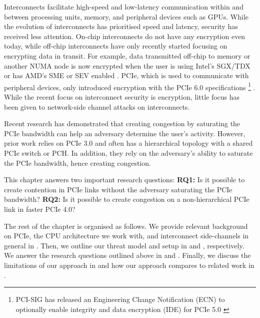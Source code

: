 
Interconnects facilitate high-speed and low-latency communication within and between processing units, memory, and peripheral devices such as GPUs.
While the evolution of interconnects has prioritised speed and latency, security has received less attention.
On-chip interconnects do not have any encryption even today, while off-chip interconnects have only recently started focusing on encrypting data in transit.
For example, data transmitted off-chip to memory or another NUMA node is now encrypted when the user is using Intel's SGX/TDX or has AMD's SME or SEV enabled \cite{intel_upi_encryption, amd_gen_5_arch}.
PCIe, which is used to communicate with peripheral devices, only introduced encryption with the PCIe 6.0 specifications 
\footnote{PCI-SIG has released an Engineering Change Notification (ECN) to optionally enable integrity and data encryption (IDE) for PCIe 5.0 \cite{pcie_ide_v5_ecn}}
\cite{pcie_ide_v6}.
While the recent focus on interconnect security is encryption, little focus has been given to network-side channel attacks on interconnects.

Recent research has demonstrated that creating congestion by saturating the PCIe bandwidth can help an adversary determine the user's activity.
However, prior work relies on PCIe 3.0 and often has a hierarchical topology with a shared PCIe switch or PCH.
In addition, they rely on the adversary's ability to saturate the PCIe bandwidth, hence creating congestion.

This chapter answers two important research questions:
\textbf{RQ1:} Is it possible to create contention in PCIe links without the adversary saturating the PCIe bandwidth?
\textbf{RQ2:} Is it possible to create congestion on a non-hierarchical PCIe link in faster PCIe 4.0?

The rest of the chapter is organised as follows.
We provide relevant background on PCIe, the CPU architecture we work with, and interconnect side-channels in general in . 
Then, we outline our threat model and setup in  and , respectively.
We answer the research questions outlined above in  and .
Finally, we discuss the limitations of our approach in  and how our approach compares to related work in .
